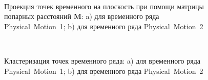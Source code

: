 \documentclass[12pt, twoside]{article}
\numberwithin{equation}{section}
\begin{document}
\begin{figure}[h!t]\center
{}
\\
\caption{Проекция точек временного на плоскость при помощи матрицы попарных расстояний $\textbf{M}$: a) для временного ряда Physical~Motion~1; b) для временного ряда Physical~Motion~2}
\label{fig_real_2D}
\end{figure}

\begin{figure}[h!t]\center
{}
\\
\caption{Кластеризация точек временного ряда: 
a) для временного ряда Physical~Motion~1; b) для временного ряда Physical~Motion~2}
\label{fig_real_claster}
\end{figure}
\end{document}
